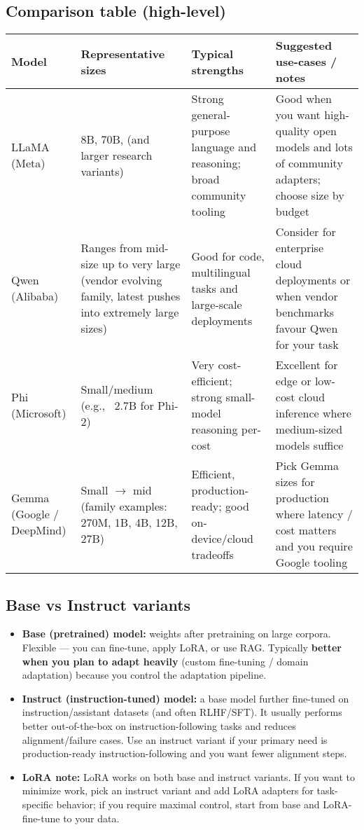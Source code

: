 \subsection{Comparison table (high-level)}
\begin{tcolorbox}[colback=gray!5!white,colframe=black,title=Model comparison at a glance]
\begin{tabular}{|p{2cm}|p{3cm}|p{4cm}|p{5.0cm}|}
\hline
\textbf{Model} & \textbf{Representative sizes} & \textbf{Typical strengths} & \textbf{Suggested use-cases / notes} \\
\hline
LLaMA (Meta) & 8B, 70B, (and larger research variants) & Strong general-purpose language and reasoning; broad community tooling & Good when you want high-quality open models and lots of community adapters; choose size by budget \\
\hline
Qwen (Alibaba) & Ranges from mid-size up to very large (vendor evolving family, latest pushes into extremely large sizes) & Good for code, multilingual tasks and large-scale deployments & Consider for enterprise cloud deployments or when vendor benchmarks favour Qwen for your task \\
\hline
Phi (Microsoft) & Small/medium (e.g., ~2.7B for Phi-2) & Very cost-efficient; strong small-model reasoning per-cost & Excellent for edge or low-cost cloud inference where medium-sized models suffice \\
\hline
Gemma (Google / DeepMind) & Small $\to$ mid (family examples: 270M, 1B, 4B, 12B, 27B) & Efficient, production-ready; good on-device/cloud tradeoffs & Pick Gemma sizes for production where latency / cost matters and you require Google tooling \\
\hline
\end{tabular}
\end{tcolorbox}

\subsection{Base vs Instruct variants}
\begin{itemize}
  \item \textbf{Base (pretrained) model:} weights after pretraining on large corpora. Flexible — you can fine-tune, apply LoRA, or use RAG. Typically \textbf{better when you plan to adapt heavily} (custom fine-tuning / domain adaptation) because you control the adaptation pipeline.
  \item \textbf{Instruct (instruction-tuned) model:} a base model further fine-tuned on instruction/assistant datasets (and often RLHF/SFT). It usually performs better out-of-the-box on instruction-following tasks and reduces alignment/failure cases. Use an instruct variant if your primary need is production-ready instruction-following and you want fewer alignment steps.
  \item \textbf{LoRA note:} LoRA works on both base and instruct variants. If you want to minimize work, pick an instruct variant and add LoRA adapters for task-specific behavior; if you require maximal control, start from base and LoRA-fine-tune to your data.
\end{itemize}

